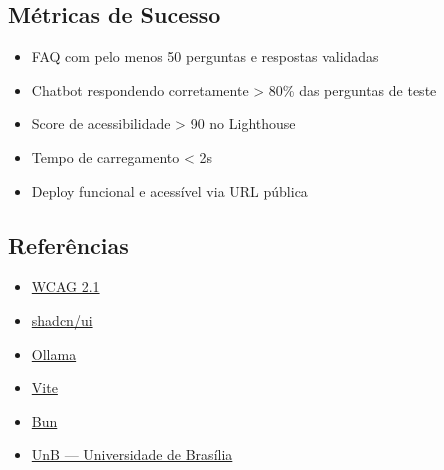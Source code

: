 \documentclass[12pt, a4paper]{article}
\begin{document}
\subsection{Métricas de Sucesso}

\begin{itemize}
  \item FAQ com pelo menos 50 perguntas e respostas validadas
  \item Chatbot respondendo corretamente > 80\% das perguntas de teste
  \item Score de acessibilidade > 90 no Lighthouse
  \item Tempo de carregamento < 2s
  \item Deploy funcional e acessível via URL pública
\end{itemize}

\subsection{Referências}

\begin{itemize}
  \item \href{https://www.w3.org/TR/WCAG21/}{WCAG 2.1}
  \item \href{https://ui.shadcn.com}{shadcn/ui}
  \item \href{https://ollama.ai}{Ollama}
  \item \href{https://vitejs.dev}{Vite}
  \item \href{https://bun.sh}{Bun}
  \item \href{https://unb.br}{UnB — Universidade de Brasília}
\end{itemize}
\end{document}
